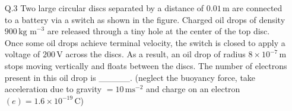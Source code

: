 
\begin{enumerate}
    \item[Q.3] Two large circular discs separated by a distance of \(0.01 \, \text{m}\) are connected to a battery via a switch as shown in the figure. Charged oil drops of density \(900 \, \text{kg m}^{-3}\) are released through a tiny hole at the center of the top disc. Once some oil drops achieve terminal velocity, the switch is closed to apply a voltage of \(200 \, \text{V}\) across the discs. As a result, an oil drop of radius \(8 \times 10^{-7} \, \text{m}\) stops moving vertically and floats between the discs. The number of electrons present in this oil drop is \_\_\_\_\_. (neglect the buoyancy force, take acceleration due to gravity \(= 10 \, \text{ms}^{-2}\) and charge on an electron \((e) = 1.6 \times 10^{-19} \, \text{C}\))
    \begin{center}
    \end{center}
\end{enumerate}
